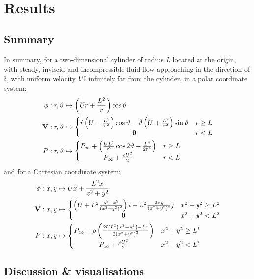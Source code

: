 \section{Results}
\subsection{Summary}
In summary, for a two-dimensional cylinder of radius $L$ located at the origin, with steady, inviscid and incompressible fluid flow approaching
in the direction of $\hat{\imath}$, with uniform velocity $U\hat{\imath}$ infinitely far from the cylinder, in a polar coordinate system:
\begin{align*}
	\phi:r,\vartheta&\mapsto\left(Ur+\frac{L^2}{r}\right)\cos\vartheta\\
	\mathbf{V}:r,\vartheta&\mapsto\left\{\begin{matrix}
		\hat{r}\left(U-\frac{L^2}{r^{2}}\right)\cos\vartheta-\hat{\vartheta}\left(U+\frac{L^2}{r^{2}}\right)\sin\vartheta&r\geq L\\
		\mathbf{0}&r<L
	\end{matrix}\right.\\
  	P:r,\vartheta&\mapsto\left\{\begin{matrix}
    	P_\infty+\left(\frac{UL^2}{r^2}\cos2\vartheta-\frac{L^4}{2r^4}\right) & r\geq L\\
    	P_\infty+\frac{\rho U^2}{2} & r<L
  	\end{matrix}\right.
\end{align*}
and for a Cartesian coordinate system:
\begin{align*}
	\phi:x,y&\mapsto Ux+\frac{L^2x}{x^2+y^2}\\
	\mathbf{V}:x,y&\mapsto\left\{\begin{matrix}
        \left(U+L^2\frac{y^2-x^2}{\left(x^2+y^2\right)^2}\right)\hat{\imath}-L^2\frac{2xy}{(x^2+y^2)^2}\hat{\jmath}&x^2+y^2\geq L^2\\
        \mathbf{0}&x^2+y^2<L^2
    \end{matrix}\right.\\
	P:x,y&\mapsto\left\{\begin{matrix}
        P_\infty+\rho\left(\frac{2UL^2\left(x^2-y^2\right)-L^4}{2\left(x^2+y^2\right)^2}\right) & x^2+y^2\geq L^2\\
        P_\infty+\frac{\rho U^2}{2} & x^2+y^2<L^2
    \end{matrix}\right.
\end{align*}

\subsection{Discussion \& visualisations}
